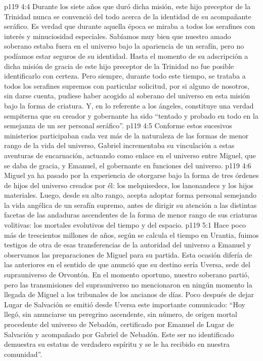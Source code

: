 \vs p119 4:4 Durante los siete años que duró dicha misión, este hijo preceptor de la Trinidad nunca se convenció del todo acerca de la identidad de su acompañante seráfico. Es verdad que durante aquella época se miraba a todos los serafines con interés y minuciosidad especiales. Sabíamos muy bien que nuestro amado soberano estaba fuera en el universo bajo la apariencia de un serafín, pero no podíamos estar seguros de su identidad. Hasta el momento de su adscripción a dicha misión de gracia de este hijo preceptor de la Trinidad no fue posible identificarlo con certeza. Pero siempre, durante todo este tiempo, se trataba a todos los serafines supremos con particular solicitud, por si alguno de nosotros, sin darse cuenta, pudiese haber acogido al soberano del universo en esta misión bajo la forma de criatura. Y, en lo referente a los ángeles, constituye una verdad sempiterna que su creador y gobernante ha sido “tentado y probado en todo en la semejanza de un ser personal seráfico”.
\vs p119 4:5 Conforme estos sucesivos ministerios participaban cada vez más de la naturaleza de las formas de menor rango de la vida del universo, Gabriel incrementaba su vinculación a estas aventuras de encarnación, actuando como enlace en el universo entre Miguel, que se daba de gracia, y Emanuel, el gobernante en funciones del universo.
\vs p119 4:6 \pc Miguel ya ha pasado por la experiencia de otorgarse bajo la forma de tres órdenes de hijos del universo creados por él: los melquisedecs, los lanonandecs y los hijos materiales. Luego, desde su alto rango, acepta adoptar forma personal semejando la vida angélica de un serafín supremo, antes de dirigir su atención a las distintas facetas de las andaduras ascendentes de la forma de menor rango de sus criaturas volitivas: los mortales evolutivos del tiempo y del espacio.
\vs p119 5:1 Hace poco más de trescientos millones de años, según se calcula el tiempo en Urantia, fuimos testigos de otra de esas transferencias de la autoridad del universo a Emanuel y observamos las preparaciones de Miguel para su partida. Esta ocasión difería de las anteriores en el sentido de que anunció que su destino sería Uversa, sede del suprauniverso de Orvontón. En el momento oportuno, nuestro soberano partió, pero las transmisiones del suprauniverso no mencionaron en ningún momento la llegada de Miguel a los tribunales de los ancianos de días. Poco después de dejar Lugar de Salvación se emitió desde Uversa este importante comunicado: “Hoy llegó, sin anunciarse un peregrino ascendente, sin número, de origen mortal procedente del universo de Nebadón, certificado por Emanuel de Lugar de Salvación y acompañado por Gabriel de Nebadón. Este ser no identificado demuestra su estatus de verdadero espíritu y se le ha recibido en nuestra comunidad”.
